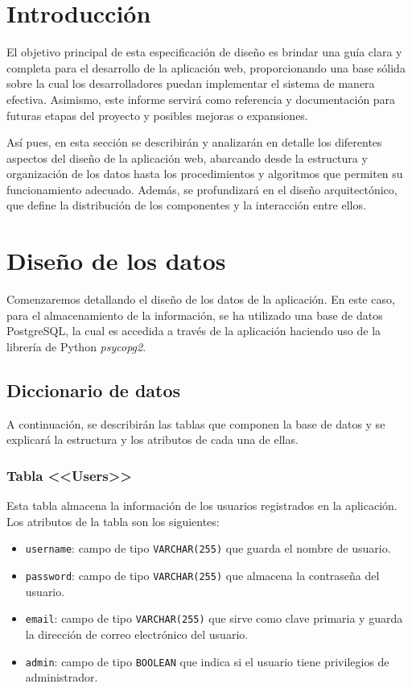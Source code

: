 
\section{Introducción}

El objetivo principal de esta especificación de diseño es brindar una guía clara y completa para el desarrollo de la aplicación web, proporcionando una base sólida sobre la cual los desarrolladores puedan implementar el sistema de manera efectiva. Asimismo, este informe servirá como referencia y documentación para futuras etapas del proyecto y posibles mejoras o expansiones.

Así pues, en esta sección se describirán y analizarán en detalle los diferentes aspectos del diseño de la aplicación web, abarcando desde la estructura y organización de los datos hasta los procedimientos y algoritmos que permiten su funcionamiento adecuado. Además, se profundizará en el diseño arquitectónico, que define la distribución de los componentes y la interacción entre ellos.

\section{Diseño de los datos}

Comenzaremos detallando el diseño de los datos de la aplicación. En este caso, para el almacenamiento de la información, se ha utilizado una base de datos PostgreSQL, la cual es accedida a través de la aplicación haciendo uso de la librería de Python \textit{psycopg2}. 

\subsection{Diccionario de datos}
A continuación, se describirán las tablas que componen la base de datos y se explicará la estructura y los atributos de cada una de ellas.

\subsubsection{Tabla <<Users>>}

Esta tabla almacena la información de los usuarios registrados en la aplicación. Los atributos de la tabla son los siguientes:
\begin{itemize}
    \item \texttt{username}: campo de tipo \texttt{VARCHAR(255)} que guarda el nombre de usuario.
    \item \texttt{password}: campo de tipo \texttt{VARCHAR(255)} que almacena la contraseña del usuario.
    \item \texttt{email}: campo de tipo \texttt{VARCHAR(255)} que sirve como clave primaria y guarda la dirección de correo electrónico del usuario.
    \item \texttt{admin}: campo de tipo \texttt{BOOLEAN} que indica si el usuario tiene privilegios de administrador.
\end{itemize}

